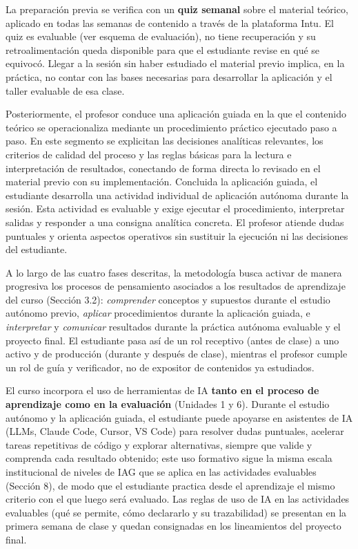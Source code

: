 \documentclass[11pt,a4paper]{article}
\begin{document}
\vspace{0.3cm}

La preparación previa se verifica con un \textbf{quiz semanal} sobre el material teórico, aplicado en todas las semanas de contenido a través de la plataforma Intu. El quiz es evaluable (ver esquema de evaluación), no tiene recuperación y su retroalimentación queda disponible para que el estudiante revise en qué se equivocó. Llegar a la sesión sin haber estudiado el material previo implica, en la práctica, no contar con las bases necesarias para desarrollar la aplicación y el taller evaluable de esa clase.

\vspace{0.3cm}

Posteriormente, el profesor conduce una aplicación guiada en la que el contenido teórico se operacionaliza mediante un procedimiento práctico ejecutado paso a paso. En este segmento se explicitan las decisiones analíticas relevantes, los criterios de calidad del proceso y las reglas básicas para la lectura e interpretación de resultados, conectando de forma directa lo revisado en el material previo con su implementación. Concluida la aplicación guiada, el estudiante desarrolla una actividad individual de aplicación autónoma durante la sesión. Esta actividad es evaluable y exige ejecutar el procedimiento, interpretar salidas y responder a una consigna analítica concreta. El profesor atiende dudas puntuales y orienta aspectos operativos sin sustituir la ejecución ni las decisiones del estudiante.

\vspace{0.3cm}

A lo largo de las cuatro fases descritas, la metodología busca activar de manera progresiva los procesos de pensamiento asociados a los resultados de aprendizaje del curso (Sección 3.2): \textit{comprender} conceptos y supuestos durante el estudio autónomo previo, \textit{aplicar} procedimientos durante la aplicación guiada, e \textit{interpretar} y \textit{comunicar} resultados durante la práctica autónoma evaluable y el proyecto final. El estudiante pasa así de un rol receptivo (antes de clase) a uno activo y de producción (durante y después de clase), mientras el profesor cumple un rol de guía y verificador, no de expositor de contenidos ya estudiados.

\vspace{0.3cm}

El curso incorpora el uso de herramientas de IA \textbf{tanto en el proceso de aprendizaje como en la evaluación} (Unidades 1 y 6). Durante el estudio autónomo y la aplicación guiada, el estudiante puede apoyarse en asistentes de IA (LLMs, Claude Code, Cursor, VS Code) para resolver dudas puntuales, acelerar tareas repetitivas de código y explorar alternativas, siempre que valide y comprenda cada resultado obtenido; este uso formativo sigue la misma escala institucional de niveles de IAG que se aplica en las actividades evaluables (Sección 8), de modo que el estudiante practica desde el aprendizaje el mismo criterio con el que luego será evaluado. Las reglas de uso de IA en las actividades evaluables (qué se permite, cómo declararlo y su trazabilidad) se presentan en la primera semana de clase y quedan consignadas en los lineamientos del proyecto final.
\end{document}
